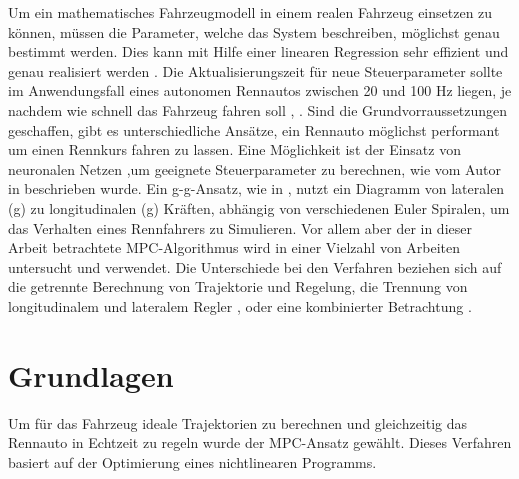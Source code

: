 \documentclass{like}
\begin{document}
Um ein mathematisches Fahrzeugmodell in einem realen Fahrzeug einsetzen zu können, müssen die Parameter, welche das System beschreiben, möglichst genau bestimmt werden. Dies kann mit Hilfe einer linearen Regression sehr effizient und genau realisiert werden \cite{Williams2016AggressiveDW}. Die Aktualisierungszeit für neue Steuerparameter sollte im Anwendungsfall eines autonomen Rennautos zwischen 20 und 100 Hz liegen, je nachdem wie schnell das Fahrzeug fahren soll \cite{rc_car_1_43}, \cite{Williams2016AggressiveDW}. 
\newline
Sind die Grundvorraussetzungen geschaffen, gibt es unterschiedliche Ansätze, ein Rennauto möglichst performant um einen Rennkurs fahren zu lassen. Eine Möglichkeit ist der Einsatz von neuronalen Netzen ,um geeignete Steuerparameter zu berechnen, wie vom Autor in \cite{6374146} beschrieben wurde. 
Ein \glqq g-g\grqq-Ansatz, wie in \cite{KRITAYAKIRANA2010548}, nutzt ein Diagramm von lateralen (g) zu longitudinalen (g) Kräften, abhängig von verschiedenen Euler Spiralen, um das Verhalten eines Rennfahrers zu Simulieren. Vor allem aber der in dieser Arbeit betrachtete \ac{MPC}-Algorithmus wird in einer Vielzahl von Arbeiten untersucht und verwendet. 
Die Unterschiede bei den Verfahren beziehen sich auf die getrennte Berechnung von Trajektorie und Regelung, die Trennung von longitudinalem und lateralem Regler \cite{MPC_Dynamic}, \cite{MPC_Dynamic_Tire_Model} oder eine kombinierter Betrachtung \cite{rc_car_1_43}.


\chapter{Grundlagen}
Um für das Fahrzeug ideale Trajektorien zu berechnen und gleichzeitig das Rennauto in Echtzeit zu regeln wurde der \ac{MPC}-Ansatz gewählt. Dieses Verfahren basiert auf der Optimierung eines nichtlinearen Programms.
 
\end{document}
